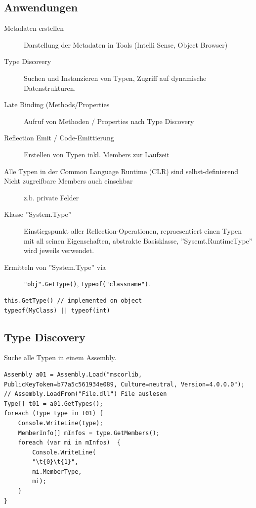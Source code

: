 \documentclass[
a4paper,
oneside,
10pt,
fleqn,
headsepline,
toc=listofnumbered, 
bibliography=totocnumbered]{scrartcl}
\begin{document}
\subsection{Anwendungen}
\begin{description}
	\item[Metadaten erstellen] Darstellung der Metadaten in Tools (Intelli Sense, Object Browser)
	\item[Type Discovery] Suchen und Instanzieren von Typen, Zugriff auf dynamische Datenstrukturen.
	\item[Late Binding (Methods/Properties] Aufruf von Methoden / Properties nach Type Discovery
	\item[Reflection Emit / Code-Emittierung] Erstellen von Typen inkl. Members zur Laufzeit
	\item[Alle Typen in der Common Language Runtime (CLR) sind selbst-definierend]
	\item[Nicht zugreifbare Members auch einsehbar] z.b. private Felder
	\item[Klasse ''System.Type''] Einstiegspunkt aller Reflection-Operationen, repraesentiert einen Typen mit all seinen Eigenschaften, abstrakte Basisklasse, ''Sysemt.RuntimeType'' wird jeweils verwendet.
	\item[Ermitteln von ''System.Type'' via] \lstinline|"obj".GetType()|, \lstinline|typeof("classname")|.
\end{description}
\begin{lstlisting}
this.GetType() // implemented on object
typeof(MyClass) || typeof(int)
\end{lstlisting}

\subsection{Type Discovery}
Suche alle Typen in einem Assembly.
\begin{lstlisting}[caption=Reflection: Type Discovery]
Assembly a01 = Assembly.Load("mscorlib, PublicKeyToken=b77a5c561934e089, Culture=neutral, Version=4.0.0.0");
// Assembly.LoadFrom("File.dll") File auslesen
Type[] t01 = a01.GetTypes();
foreach (Type type in t01) {
	Console.WriteLine(type);
	MemberInfo[] mInfos = type.GetMembers();
	foreach (var mi in mInfos) 	{
		Console.WriteLine(
		"\t{0}\t{1}",
		mi.MemberType,
		mi);
	}
}
\end{lstlisting}
\end{document}
